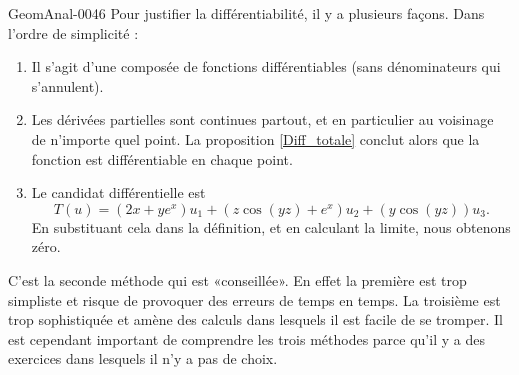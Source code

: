 \begin{corrige}{GeomAnal-0046}
        Pour justifier la différentiabilité, il y a plusieurs façons. Dans l'ordre de simplicité :
        \begin{enumerate}
            \item
                Il s'agit d'une composée de fonctions différentiables (sans dénominateurs qui s'annulent).
            \item
                Les dérivées partielles sont continues partout, et en particulier au voisinage de n'importe quel point. La proposition \ref{Diff_totale} conclut alors que la fonction est différentiable en chaque point.
            \item
                Le candidat différentielle est
                \begin{equation}
                    T(u)=(2x+ye^x)u_1+(z\cos(yz)+e^x)u_2+(y\cos(yz))u_3.
                \end{equation}
                En substituant cela dans la définition, et en calculant la limite, nous obtenons zéro.
        \end{enumerate}
        C'est la seconde méthode qui est «conseillée». En effet la première est trop simpliste et risque de provoquer des erreurs de temps en temps. La troisième est trop sophistiquée et amène des calculs dans lesquels il est facile de se tromper. Il est cependant important de comprendre les trois méthodes parce qu'il y a des exercices dans lesquels il n'y a pas de choix.
\end{corrige}
